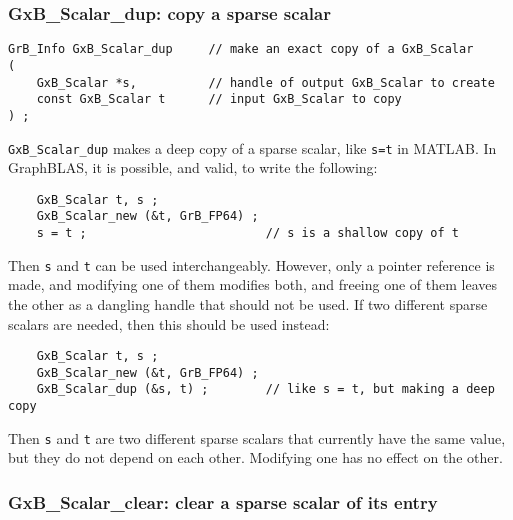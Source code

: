 \documentclass[12pt]{article}
\begin{document}
\newpage
\subsubsection{{\sf GxB\_Scalar\_dup:} copy a sparse scalar}
\label{scalar_dup}

\begin{mdframed}[userdefinedwidth=6in]
{\footnotesize
\begin{verbatim}
GrB_Info GxB_Scalar_dup     // make an exact copy of a GxB_Scalar
(
    GxB_Scalar *s,          // handle of output GxB_Scalar to create
    const GxB_Scalar t      // input GxB_Scalar to copy
) ;
\end{verbatim}
} \end{mdframed}

\verb'GxB_Scalar_dup' makes a deep copy of a sparse scalar, like \verb's=t' in
MATLAB.  In GraphBLAS, it is possible, and valid, to write the following:

    {\footnotesize
    \begin{verbatim}
    GxB_Scalar t, s ;
    GxB_Scalar_new (&t, GrB_FP64) ;
    s = t ;                         // s is a shallow copy of t  \end{verbatim}}

Then \verb's' and \verb't' can be used interchangeably.  However, only a pointer
reference is made, and modifying one of them modifies both, and freeing one of
them leaves the other as a dangling handle that should not be used.
If two different sparse scalars are needed, then this should be used instead:

    {\footnotesize
    \begin{verbatim}
    GxB_Scalar t, s ;
    GxB_Scalar_new (&t, GrB_FP64) ;
    GxB_Scalar_dup (&s, t) ;        // like s = t, but making a deep copy \end{verbatim}}

Then \verb's' and \verb't' are two different sparse scalars that currently have
the same value, but they do not depend on each other.  Modifying one has no
effect on the other.

\subsubsection{{\sf GxB\_Scalar\_clear:} clear a sparse scalar of its entry}
\label{scalar_clear}
\end{document}
